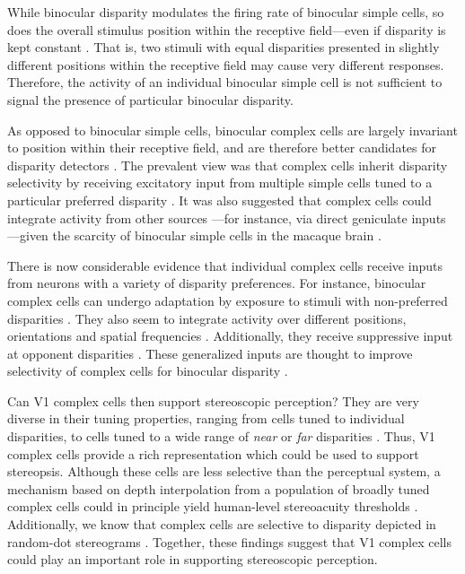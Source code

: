 While binocular disparity modulates the firing rate of binocular simple cells, so does the overall stimulus position within the receptive field---even if disparity is kept constant \cite{Ohzawa:1990cq,Anzai:1997ud,Anzai:1999xd}. That is, two stimuli with equal disparities presented in slightly different positions within the receptive field may cause very different responses. Therefore, the activity of an individual binocular simple cell is not sufficient to signal the presence of particular binocular disparity.

As opposed to binocular simple cells, binocular complex cells are largely invariant to position within their receptive field, and are therefore better candidates for disparity detectors \cite{Ohzawa:1990cq}. The prevalent view was that complex cells inherit disparity selectivity by receiving excitatory input from multiple simple cells tuned to a particular preferred disparity \cite{Ohzawa:1986xy,Ohzawa:1990cq,Ohzawa:1997bd,Anzai1999}. It was also suggested that complex cells could integrate activity from other sources \cite{Livingstone:1999mp}---for instance, via direct geniculate inputs \cite{Archie:2000fk}---given the scarcity of binocular simple cells in the macaque brain \cite{Hubel:1968hz}.

There is now considerable evidence that individual complex cells receive inputs from neurons with a variety of disparity preferences. For instance, binocular complex cells can undergo adaptation by exposure to stimuli with non-preferred disparities \cite{Duong:2011fk}. They also seem to integrate activity over different positions, orientations and spatial frequencies \cite{Sasaki:2010pi,Baba:2015ij,Kato:2016fk}. Additionally, they receive suppressive input at opponent disparities \cite{Tanabe:2014ud,Tanabe:2011pt,Haefner:2008jg}. These generalized inputs are thought to improve selectivity of complex cells for binocular disparity \cite{Haefner:2008jg,Tanabe:2011pt,Kato:2016fk}.

Can V1 complex cells then support stereoscopic perception? They are very diverse in their tuning properties, ranging from cells tuned to individual disparities, to cells tuned to a wide range of \textit{near} or \textit{far} disparities \cite{Poggio:1977ys,Poggio:1988ij,Prince:2002uq}. Thus, V1 complex cells provide a rich representation which could be used to support stereopsis. Although these cells are less selective than the perceptual system, a mechanism based on depth interpolation from a population of broadly tuned complex cells could in principle yield human-level stereoacuity thresholds \cite{Lehky:1990fk,Lehky1990}. Additionally, we know that complex cells are selective to disparity depicted in random-dot stereograms \cite{Poggio:1984mi,Poggio:1988ij}. Together, these findings suggest that V1 complex cells could play an important role in supporting stereoscopic perception. 


